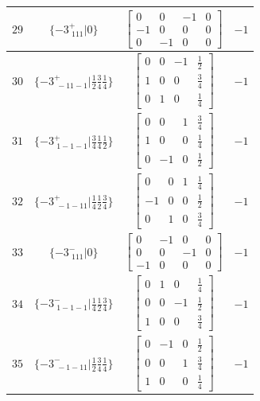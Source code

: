 \documentclass[fleqn,8pt]{jsarticle}
\begin{document}
\begin{longtable}{cccc}
$ 29 $ & $ \{-3^{+}_{\,\,111}|0\} $ & $ \begin{bmatrix} 0 & 0 & -1 & 0 \\ -1 & 0 & 0 & 0 \\ 0 & -1 & 0 & 0 \end{bmatrix} $ & $ -1 $ \\ \hline
$ 30 $ & $ \{-3^{+}_{\,\,-11-1}|\frac{1}{2} \frac{3}{4} \frac{1}{4}\} $ & $ \begin{bmatrix} 0 & 0 & -1 & \frac{1}{2} \\ 1 & 0 & 0 & \frac{3}{4} \\ 0 & 1 & 0 & \frac{1}{4} \end{bmatrix} $ & $ -1 $ \\ \hline
$ 31 $ & $ \{-3^{+}_{\,\,1-1-1}|\frac{3}{4} \frac{1}{4} \frac{1}{2}\} $ & $ \begin{bmatrix} 0 & 0 & 1 & \frac{3}{4} \\ 1 & 0 & 0 & \frac{1}{4} \\ 0 & -1 & 0 & \frac{1}{2} \end{bmatrix} $ & $ -1 $ \\ \hline
$ 32 $ & $ \{-3^{+}_{\,\,-1-11}|\frac{1}{4} \frac{1}{2} \frac{3}{4}\} $ & $ \begin{bmatrix} 0 & 0 & 1 & \frac{1}{4} \\ -1 & 0 & 0 & \frac{1}{2} \\ 0 & 1 & 0 & \frac{3}{4} \end{bmatrix} $ & $ -1 $ \\ \hline
$ 33 $ & $ \{-3^{-}_{\,\,111}|0\} $ & $ \begin{bmatrix} 0 & -1 & 0 & 0 \\ 0 & 0 & -1 & 0 \\ -1 & 0 & 0 & 0 \end{bmatrix} $ & $ -1 $ \\ \hline
$ 34 $ & $ \{-3^{-}_{\,\,1-1-1}|\frac{1}{4} \frac{1}{2} \frac{3}{4}\} $ & $ \begin{bmatrix} 0 & 1 & 0 & \frac{1}{4} \\ 0 & 0 & -1 & \frac{1}{2} \\ 1 & 0 & 0 & \frac{3}{4} \end{bmatrix} $ & $ -1 $ \\ \hline
$ 35 $ & $ \{-3^{-}_{\,\,-1-11}|\frac{1}{2} \frac{3}{4} \frac{1}{4}\} $ & $ \begin{bmatrix} 0 & -1 & 0 & \frac{1}{2} \\ 0 & 0 & 1 & \frac{3}{4} \\ 1 & 0 & 0 & \frac{1}{4} \end{bmatrix} $ & $ -1 $ \\ \hline

\end{longtable}
\end{document}
